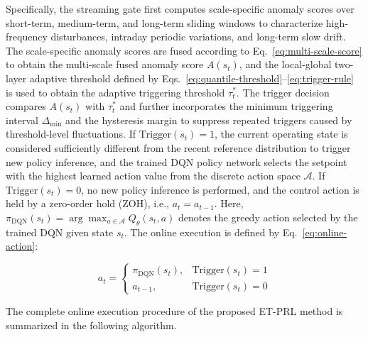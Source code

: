 ﻿\documentclass[preprint,12pt,number]{elsarticle}
\begin{document}
Specifically, the streaming gate first computes scale-specific anomaly scores over short-term, medium-term, and long-term sliding windows to characterize high-frequency disturbances, intraday periodic variations, and long-term slow drift. The scale-specific anomaly scores are fused according to Eq.~\eqref{eq:multi-scale-score} to obtain the multi-scale fused anomaly score \(A(s_t)\), and the local-global two-layer adaptive threshold defined by Eqs.~\eqref{eq:quantile-threshold}--\eqref{eq:trigger-rule} is used to obtain the adaptive triggering threshold \(\tau_t^*\). The trigger decision compares \(A(s_t)\) with \(\tau_t^*\) and further incorporates the minimum triggering interval \(\Delta_{\min}\) and the hysteresis margin to suppress repeated triggers caused by threshold-level fluctuations. If \(\mathrm{Trigger}(s_t)=1\), the current operating state is considered sufficiently different from the recent reference distribution to trigger new policy inference, and the trained DQN policy network selects the setpoint with the highest learned action value from the discrete action space \(\mathcal{A}\). If \(\mathrm{Trigger}(s_t)=0\), no new policy inference is performed, and the control action is held by a zero-order hold (ZOH), i.e., \(a_t = a_{t-1}\). Here, \(\pi_{\mathrm{DQN}}(s_t)=\arg\max_{a\in\mathcal{A}}Q_{\theta}(s_t,a)\) denotes the greedy action selected by the trained DQN given state \(s_t\). The online execution is defined by Eq.~\eqref{eq:online-action}:

\[a_t = \begin{cases}\pi_{\mathrm{DQN}}(s_t), & \mathrm{Trigger}(s_t) = 1 \\a_{t-1}, & \mathrm{Trigger}(s_t) = 0\end{cases} \tag{23}\label{eq:online-action}\]

The complete online execution procedure of the proposed ET-PRL method is summarized in the following algorithm.
\end{document}
